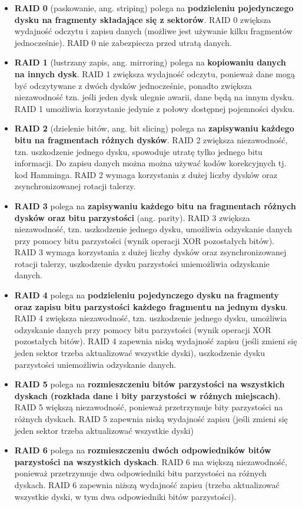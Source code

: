 \documentclass{article}
\begin{document}
\newpage \begin{itemize}
    \item \textbf{RAID 0} (paskowanie, ang. striping) polega na \textbf{podzieleniu pojedynczego dysku na fragmenty składające się z sektorów}. RAID 0 zwiększa wydajność odczytu i zapisu danych (możliwe jest używanie kilku fragmentów jednocześnie). RAID 0 nie zabezpiecza przed utratą danych.
    \item \textbf{RAID 1} (lustrzany zapis, ang. mirroring) polega na \textbf{kopiowaniu danych na innych dysk}. RAID 1 zwiększa wydajność odczytu, ponieważ dane mogą być odczytywane z dwóch dysków jednocześnie, ponadto zwiększa niezawodność tzn. jeśli jeden dysk ulegnie awarii, dane będą na innym dysku. RAID 1 umożliwia korzystanie jedynie z połowy dostępnej pojemności dysku.
    \item \textbf{RAID 2} (dzielenie bitów, ang. bit slicing) polega na \textbf{zapisywaniu każdego bitu na fragmentach różnych dysków}. RAID 2 zwiększa niezawodność, tzn. uszkodzenie jednego dysku, spowoduje utratę tylko jednego bitu informacji. Do zapisu danych można można używać kodów korekcyjnych tj. kod Hamminga. RAID 2 wymaga korzystania z dużej liczby dysków oraz zsynchronizowanej rotacji talerzy.
    \item \textbf{RAID 3} polega na \textbf{zapisywaniu każdego bitu na fragmentach różnych dysków oraz bitu parzystości} (ang. parity). RAID 3 zwiększa niezawodność, tzn. uszkodzenie jednego dysku, umożliwia odzyskanie danych przy pomocy bitu parzystości (wynik operacji XOR pozostałych bitów). RAID 3 wymaga korzystania z dużej liczby dysków oraz zsynchronizowanej rotacji talerzy, uszkodzenie dysku parzystości uniemożliwia odzyskanie danych.
    \item \textbf{RAID 4} polega na \textbf{podzieleniu pojedynczego dysku na fragmenty oraz zapisu bitu parzystości każdego fragmentu na jednym dysku}. RAID 4 zwiększa niezawodność, tzn. uszkodzenie jednego dysku, umożliwia odzyskanie danych przy pomocy bitu parzystości (wynik operacji XOR pozostałych bitów). RAID 4 zapewnia niską wydajność zapisu (jeśli zmieni się jeden sektor trzeba aktualizować wszystkie dyski), uszkodzenie dysku parzystości uniemożliwia odzyskanie danych.
    \item \textbf{RAID 5} polega na \textbf{rozmieszczeniu bitów parzystości na wszystkich dyskach (rozkłada dane i bity parzystości w różnych miejscach)}. RAID 5 większą niezawodność, ponieważ przetrzymuje bity parzystości na różnych dyskach. RAID 5 zapewnia niską wydajność zapisu (jeśli zmieni się jeden sektor trzeba aktualizować wszystkie dyski)
    \item \textbf{RAID 6} polega na \textbf{rozmieszczeniu dwóch odpowiedników bitów parzystości na wszystkich dyskach}. RAID 6 ma większą niezawodność, ponieważ przetrzymuje dwa odpowiedniki bitu parzystości na różnych dyskach. RAID 6 zapewnia niższą wydajność zapisu (trzeba aktualizować wszystkie dyski, w tym dwa odpowiedniki bitów parzystości).
\end{itemize}
\end{document}
